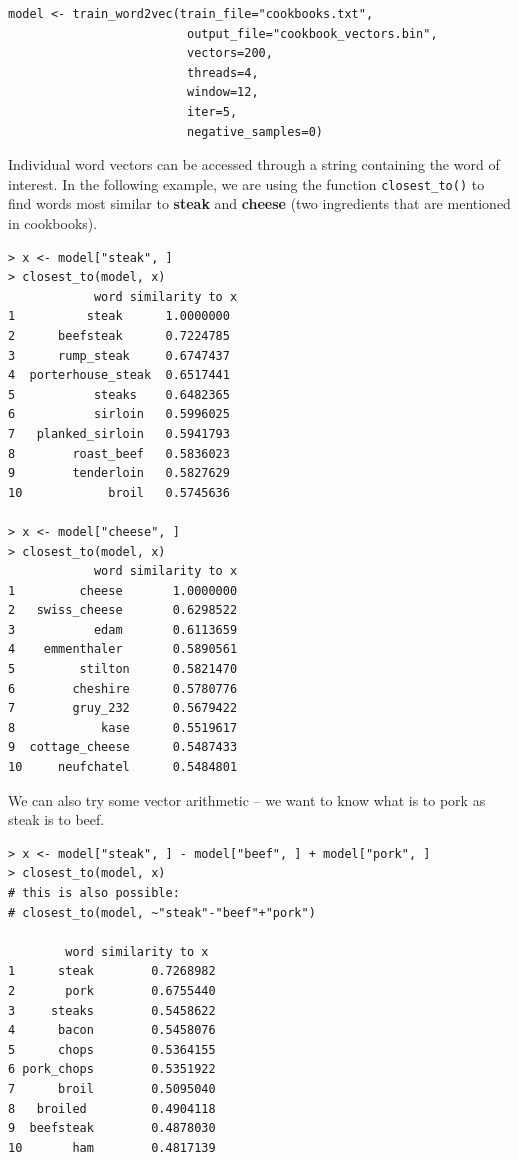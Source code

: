 \documentclass[11pt,openany,executivepaper]{book}
\begin{document}
\begin{verbatim}
model <- train_word2vec(train_file="cookbooks.txt",
                         output_file="cookbook_vectors.bin",
                         vectors=200,
                         threads=4,
                         window=12,
                         iter=5,
                         negative_samples=0)
\end{verbatim}

Individual word vectors can be accessed through a string containing the word
of interest. In the following example, we are using the function \texttt{closest\_to()} to
find words most similar to \textbf{steak} and \textbf{cheese} (two ingredients that are mentioned
in cookbooks).

\vspace{0.5em}

\begin{verbatim}
> x <- model["steak", ]
> closest_to(model, x)
            word similarity to x
1          steak      1.0000000
2      beefsteak      0.7224785
3      rump_steak     0.6747437
4  porterhouse_steak  0.6517441
5           steaks    0.6482365
6           sirloin   0.5996025
7   planked_sirloin   0.5941793
8        roast_beef   0.5836023
9        tenderloin   0.5827629
10            broil   0.5745636

> x <- model["cheese", ]
> closest_to(model, x)
            word similarity to x
1         cheese       1.0000000
2   swiss_cheese       0.6298522
3           edam       0.6113659
4    emmenthaler       0.5890561
5         stilton      0.5821470
6        cheshire      0.5780776
7        gruy_232      0.5679422
8            kase      0.5519617
9  cottage_cheese      0.5487433
10     neufchatel      0.5484801
\end{verbatim}

We can also try some vector arithmetic -- we want to know what is to pork as steak is to beef.

\begin{verbatim}
> x <- model["steak", ] - model["beef", ] + model["pork", ]
> closest_to(model, x)
# this is also possible:
# closest_to(model, ~"steak"-"beef"+"pork")

        word similarity to x
1      steak        0.7268982
2       pork        0.6755440
3     steaks        0.5458622
4      bacon        0.5458076
5      chops        0.5364155
6 pork_chops        0.5351922
7      broil        0.5095040
8   broiled         0.4904118
9  beefsteak        0.4878030
10       ham        0.4817139
\end{verbatim}
\end{document}
